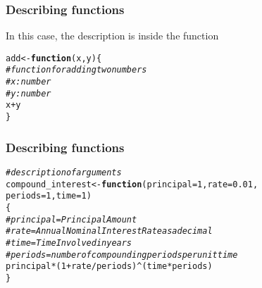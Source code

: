 \documentclass[12pt]{beamer}\usepackage[]{graphicx}\usepackage[]{color}
\makeatletter
\newcommand{\hlnum}[1]{\textcolor[rgb]{0.686,0.059,0.569}{#1}}%
\newcommand{\hlcom}[1]{\textcolor[rgb]{0.678,0.584,0.686}{\textit{#1}}}%
\newcommand{\hlopt}[1]{\textcolor[rgb]{0,0,0}{#1}}%
\newcommand{\hlstd}[1]{\textcolor[rgb]{0.345,0.345,0.345}{#1}}%
\newcommand{\hlkwa}[1]{\textcolor[rgb]{0.161,0.373,0.58}{\textbf{#1}}}%
\newcommand{\hlkwb}[1]{\textcolor[rgb]{0.69,0.353,0.396}{#1}}%
\newcommand{\hlkwc}[1]{\textcolor[rgb]{0.333,0.667,0.333}{#1}}%
\newenvironment{kframe}{%
 \def\at@end@of@kframe{}%
 \ifinner\ifhmode%
  \def\at@end@of@kframe{\end{minipage}}%
  \begin{minipage}{\columnwidth}%
 \fi\fi%
 \def\FrameCommand##1{\hskip\@totalleftmargin \hskip-\fboxsep
 \colorbox{shadecolor}{##1}\hskip-\fboxsep
     \hskip-\linewidth \hskip-\@totalleftmargin \hskip\columnwidth}%
 \MakeFramed {\advance\hsize-\width
   \@totalleftmargin\z@ \linewidth\hsize
   \@setminipage}}%
 {\par\unskip\endMakeFramed%
 \at@end@of@kframe}
\newenvironment{knitrout}{}{} %
\makeatother
\begin{document}

\begin{frame}[fragile]
\frametitle{Describing functions}

In this case, the description is inside the function
\begin{knitrout}\footnotesize
{}\color{fgcolor}\begin{kframe}
\begin{alltt}
\hlstd{add} \hlkwb{<-} \hlkwa{function}\hlstd{(}\hlkwc{x}\hlstd{,} \hlkwc{y}\hlstd{) \{}
  \hlcom{# function for adding two numbers}
  \hlcom{# x: number}
  \hlcom{# y: number}
  \hlstd{x} \hlopt{+} \hlstd{y}
\hlstd{\}}
\end{alltt}
\end{kframe}
\end{knitrout}

\end{frame}


\begin{frame}[fragile]
\frametitle{Describing functions}

\begin{knitrout}\footnotesize
{}\color{fgcolor}\begin{kframe}
\begin{alltt}
\hlcom{# description of arguments}
\hlstd{compound_interest} \hlkwb{<-} \hlkwa{function}\hlstd{(}\hlkwc{principal} \hlstd{=} \hlnum{1}\hlstd{,} \hlkwc{rate} \hlstd{=} \hlnum{0.01}\hlstd{,}
                              \hlkwc{periods} \hlstd{=} \hlnum{1}\hlstd{,} \hlkwc{time} \hlstd{=} \hlnum{1}\hlstd{)}
\hlstd{\{}
  \hlcom{# principal = Principal Amount}
  \hlcom{# rate = Annual Nominal Interest Rate as a decimal}
  \hlcom{# time = Time Involved in years}
  \hlcom{# periods = number of compounding periods per unit time}
  \hlstd{principal} \hlopt{*} \hlstd{(}\hlnum{1} \hlopt{+} \hlstd{rate}\hlopt{/}\hlstd{periods)}\hlopt{^}\hlstd{(time} \hlopt{*} \hlstd{periods)}
\hlstd{\}}
\end{alltt}
\end{kframe}
\end{knitrout}

\end{frame}


\begin{frame}
\begin{center}
\Huge{}
\end{center}
\end{frame}
\end{document}
